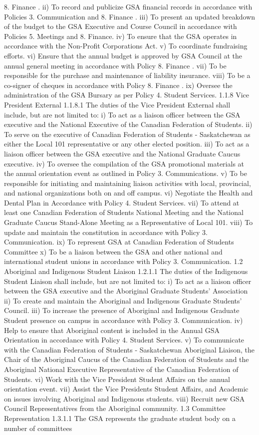 8. Finance . ii) To record and publicize GSA financial records in accordance with Policies 3. Communication and 8. Finance . iii) To present an updated breakdown of the budget to the GSA Executive and Course Council in accordance with Policies 5. Meetings and 8. Finance. iv) To ensure that the GSA operates in accordance with the Non-Profit Corporations Act. v) To coordinate fundraising efforts. vi) Ensure that the annual budget is approved by GSA Council at the annual general meeting in accordance with Policy 8. Finance . vii) To be responsible for the purchase and maintenance of liability insurance. viii) To be a co-signer of cheques in accordance with Policy 8. Finance . ix) Oversee the administration of the GSA Bursary as per Policy 4. Student Services. 1.1.8 Vice President External 1.1.8.1 The duties of the Vice President External shall include, but are not limited to: i) To act as a liaison officer between the GSA executive and the National Executive of the Canadian Federation of Students. ii) To serve on the executive of Canadian Federation of Students - Saskatchewan as either the Local 101 representative or any other elected position. iii) To act as a liaison officer between the GSA executive and the National Graduate Caucus executive. iv) To oversee the compilation of the GSA promotional materials at the annual orientation event as outlined in Policy 3. Communications. v) To be responsible for initiating and maintaining liaison activities with local, provincial, and national organizations both on and off campus. vi) Negotiate the Health and Dental Plan in Accordance with Policy 4. Student Services. vii) To attend at least one Canadian Federation of Students National Meeting and the National Graduate Caucus Stand-Alone Meeting as a Representative of Local 101. viii) To update and maintain the constitution in accordance with Policy 3. Communication. ix) To represent GSA at Canadian Federation of Students Committee x) To be a liaison between the GSA and other national and international student unions in accordance with Policy 3. Communication. 1.2 Aboriginal and Indigenous Student Liaison 1.2.1.1 The duties of the Indigenous Student Liaison shall include, but are not limited to: i) To act as a liaison officer between the GSA executive and the Aboriginal Graduate Students' Association ii) To create and maintain the Aboriginal and Indigenous Graduate Students’ Council. iii) To increase the presence of Aboriginal and Indigenous Graduate Student presence on campus in accordance with Policy 3. Communication. iv) Help to ensure that Aboriginal content is included in the Annual GSA Orientation in accordance with Policy 4. Student Services. v) To communicate with the Canadian Federation of Students - Saskatchewan Aboriginal Liaison, the Chair of the Aboriginal Caucus of the Canadian Federation of Students and the Aboriginal National Executive Representative of the Canadian Federation of Students. vi) Work with the Vice President Student Affairs on the annual orientation event. vii) Assist the Vice Presidents Student Affairs, and Academic on issues involving Aboriginal and Indigenous students. viii) Recruit new GSA Council Representatives from the Aboriginal community. 1.3 Committee Representation 1.3.1.1 The GSA represents the graduate student body on a number of committees 